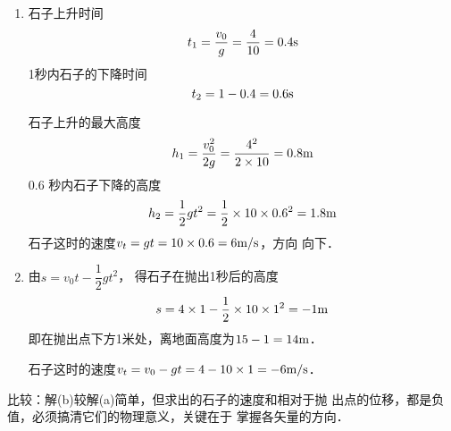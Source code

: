 \begin{enumerate}
\begin{solution}
\begin{enumerate}
    \item 石子上升时间
    \[t_1=\frac{v_0}{g}=\frac{4}{10}=0.4{\rm s}\]
    1秒内石子的下降时间$$t_2=1-0.4=0.6{\rm s}$$

    石子上升的最大高度
\[h_1=\frac{v_0^2}{2g}=\frac{4^2}{2\times 10}=0.8{\rm m}\]
0.6
秒内石子下降的高度
\[h_2=\frac{1}{2}gt^2=\frac{1}{2}\times 10\times0.6^2=1.8{\rm m}\]
石子这时的速度$v_t=gt=10\times0.6=6\text{m}/\text{s}$，方向
向下．
\item 由$s=v_0t-\dfrac{1}{2}gt^2$，
得石子在抛出1秒后的高度
\[s=4\times1-\frac{1}{2}\times10\times1^2=-1{\rm m}\]
即在抛出点下方1米处，离地面高度为$15-1=14{\rm m}$．

石子这时的速度$v_t=v_0-gt=4-10\times1=-6\text{m}/\text{s}$．
\end{enumerate}

比较：解(b)较解(a)简单，但求出的石子的速度和相对于抛
出点的位移，都是负值，必须搞清它们的物理意义，关键在于
掌握各矢量的方向．
\end{solution}
\end{enumerate}





